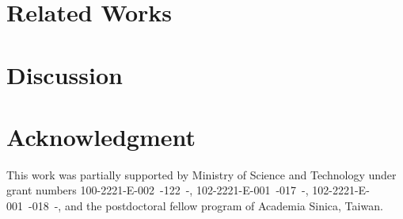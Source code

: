 \documentclass{llncs}
\begin{document}


\section{Related Works}
\label{section:related}


\section{Discussion}
\label{section:conclusion}


\section*{Acknowledgment}
This work was partially supported by Ministry of 
Science and Technology under grant numbers 
100-2221-E-002\ -122\ -,
102-2221-E-001\ -017\ -,
102-2221-E-001\ -018\ -, 
and the postdoctoral fellow program of Academia Sinica, Taiwan.



\end{document}
